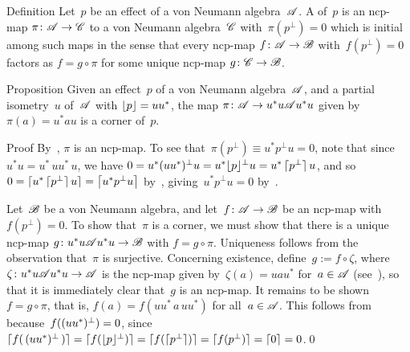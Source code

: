 \documentclass[a]{subfiles}
\begin{document}
\begin{parsec}%
\begin{point}{Definition}%
Let~$p$ be an effect of a von Neumann algebra~$\mathscr{A}$.
A  of~$p$ is an ncp-map $\pi\colon \mathscr{A}\to\mathscr{C}$
to a von Neumann algebra~$\mathscr{C}$
with~$\pi(p^\perp)=0$
which is initial among such maps 
in the sense
that every ncp-map $f\colon \mathscr{A}\to\mathscr{B}$
with~$f(p^\perp)=0$
factors as $f=g\circ\pi$
for some unique ncp-map $g\colon \mathscr{C}\to\mathscr{B}$.
\end{point}
\begin{point}{Proposition}%
Given an effect~$p$ of a von Neumann algebra~$\mathscr{A}$,
and a partial isometry~$u$ of~$\mathscr{A}$
with $\left\lfloor p\right\rfloor=uu^*$,
the map $\pi\colon \mathscr{A}\to u^*u \mathscr{A} u^*u$
given by~$\pi(a)=u^*au$ is a corner of~$p$.
\begin{point}{Proof}%
By~, $\pi$ is an ncp-map.
To see that~$\pi(p^\perp)\equiv u^*p^\perp u =0$,
note that since~$u^*u=u^*\,u u^*\,u$,
we have $0=u^*(uu^*)^\perp u =u^*\smash{\left\lfloor p\right\rfloor}^\perp u
= u^*\left\lceil\smash{p^\perp}\right\rceil u$,
and so
$0 = \left\lceil u^* \left\lceil\smash{p^\perp}\right\rceil u \right\rceil
=\left\lceil u^* p^\perp u\right\rceil$
by~,
giving~$u^*p^\perp u=0$
by~.


Let~$\mathscr{B}$ be a von Neumann algebra,
and let~$f\colon \mathscr{A}\to\mathscr{B}$ be an ncp-map
with $f(p^\perp)=0$.
To show that~$\pi$ is a corner,
we must show that there is a unique ncp-map
$g\colon u^*u \mathscr{A} u^*u\to\mathscr{B}$
with $f=g\circ \pi$.
Uniqueness follows
from the observation that~$\pi$ is surjective.
Concerning existence,
define~$g:= f\circ \zeta$,
where $\zeta\colon  u^*u\mathscr{A} u^*u\to \mathscr{A}$
is the ncp-map given by~$\zeta(a)=uau^*$
for~$a\in\mathscr{A}$ (see~),
so that it is immediately clear that~$g$ is an ncp-map.
It remains to be shown~$f=g\circ \pi$,
that is,
$f(a)=f(uu^*\,a\,uu^*)$ for all~$a\in\mathscr{A}$.
This follows from~
because~$f(\smash{(uu^*)^\perp})=0$,
since~$\left\lceil\smash{f(\,\smash{(uu^*)^\perp}\,)}\right\rceil
=\left\lceil\smash{f(\smash{\left\lfloor p\right\rfloor}^\perp)}\right\rceil
=\left\lceil\smash{f(\left\lceil\smash{p^\perp}\right\rceil)}\right\rceil
= \left\lceil\smash{f(p^\perp)}\right\rceil=\left\lceil0\right\rceil=0$.\qed
\end{point}
\end{point}
\end{parsec}
\end{document}

